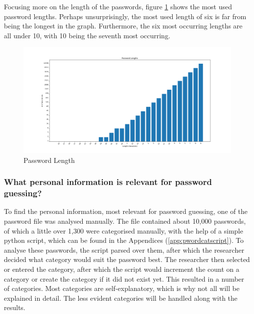 \documentclass[a4paper,12pt]{article}
\begin{document}
Focusing more on the length of the passwords, figure \ref{fig:plen} shows the most used password lengths. Perhaps unsurprisingly, the most used length of six is far from being the longest in the graph. Furthermore, the six most occurring lengths are all under 10, with 10 being the seventh most occurring.

\begin{figure}[!ht]
  \centering
  \hspace*{-5.4cm}
  \includegraphics[width=1.8\textwidth]{password_length}
  \caption{Password Length}
  \label{fig:plen}
\end{figure}

\newpage
\subsubsection{What personal information is relevant for password guessing?}

To find the personal information, most relevant for password guessing, one of the password file was analysed manually. The file contained about 10,000 passwords, of which a little over 1,300 were categorised manually, with the help of a simple python script, which can be found in the Appendices (\ref{app:pwordcatscript}). To analyse these passwords, the script parsed over them, after which the researcher decided what category would suit the password best. The researcher then selected or entered the category, after which the script would increment the count on a category or create the category if it did not exist yet. This resulted in a number of categories. Most categories are self-explanatory, which is why not all will be explained in detail. The less evident categories will be handled along with the results.
\end{document}
